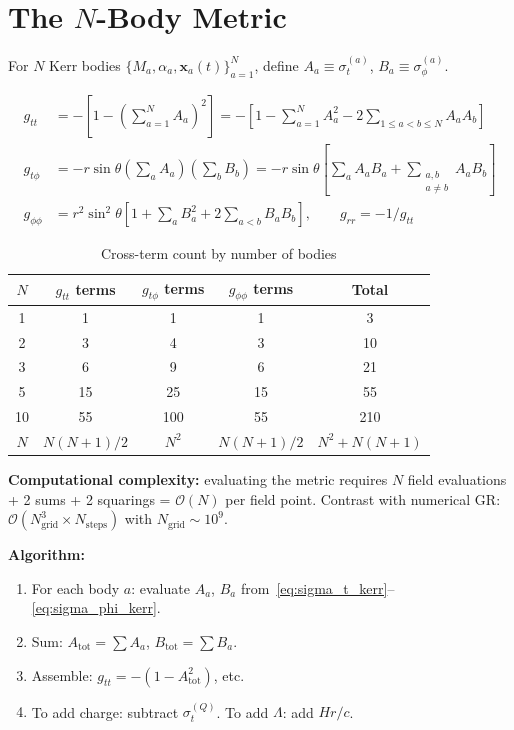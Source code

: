 \documentclass[11pt,a4paper]{article}
\theoremstyle{plain}
\theoremstyle{definition}
\theoremstyle{remark}
\newcommand{\boldx}{\mathbf{x}}
\newcommand{\sig}[2]{\sigma_{#1}^{(#2)}}
\begin{document}
\section{The $N$-Body Metric}
\label{sec:nbody}

For $N$ Kerr bodies $\{M_a, \alpha_a, \boldx_a(t)\}_{a=1}^N$, define $A_a \equiv \sig{t}{a}$, $B_a \equiv \sig{\phi}{a}$.

\begin{align}
  g_{tt} &= -\left[1 - \left(\sum_{a=1}^NA_a\right)^2\right] = -\left[1 - \sum_{a=1}^NA_a^2 - 2\sum_{1\leq a<b\leq N}A_aA_b\right] \\
  g_{t\phi} &= -r\sin\theta\left(\sum_aA_a\right)\left(\sum_bB_b\right) = -r\sin\theta\left[\sum_aA_aB_a + \sum_{\substack{a,b\\a\neq b}}A_aB_b\right] \\
  g_{\phi\phi} &= r^2\sin^2\theta\left[1 + \sum_aB_a^2 + 2\sum_{a<b}B_aB_b\right], \qquad g_{rr} = -1/g_{tt}
\end{align}

\begin{table}[h]
  \centering
  \caption{Cross-term count by number of bodies}
  \begin{tabular}{@{}ccccc@{}}
    \toprule
    $N$ & $g_{tt}$ terms & $g_{t\phi}$ terms & $g_{\phi\phi}$ terms & Total \\
    \midrule
    1 & 1 & 1 & 1 & 3 \\
    2 & 3 & 4 & 3 & 10 \\
    3 & 6 & 9 & 6 & 21 \\
    5 & 15 & 25 & 15 & 55 \\
    10 & 55 & 100 & 55 & 210 \\
    $N$ & $N(N+1)/2$ & $N^2$ & $N(N+1)/2$ & $N^2+N(N+1)$ \\
    \bottomrule
  \end{tabular}
\end{table}

\textbf{Computational complexity:} evaluating the metric requires $N$ field evaluations + 2 sums + 2 squarings = $\mathcal{O}(N)$ per field point.  Contrast with numerical GR: $\mathcal{O}(N_{\mathrm{grid}}^3 \times N_{\mathrm{steps}})$ with $N_{\mathrm{grid}} \sim 10^9$.

\textbf{Algorithm:}
\begin{enumerate}
  \item For each body $a$: evaluate $A_a$, $B_a$ from~\eqref{eq:sigma_t_kerr}--\eqref{eq:sigma_phi_kerr}.
  \item Sum: $A_{\mathrm{tot}} = \sum A_a$, $B_{\mathrm{tot}} = \sum B_a$.
  \item Assemble: $g_{tt} = -(1 - A_{\mathrm{tot}}^2)$, etc.
  \item To add charge: subtract $\sig{t}{Q}$.  To add $\Lambda$: add $Hr/c$.
\end{enumerate}
\end{document}
